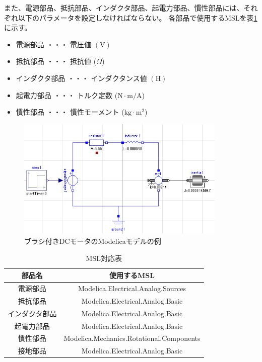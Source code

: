 また、電源部品、抵抗部品、インダクタ部品、起電力部品、慣性部品には、それぞれ以下のパラメータを設定しなければならない。
各部品で使用するMSLを表\ref{tab:MSL}に示す。
\begin{itemize}
	\item 電源部品 ・・・ 電圧値 $(\mathrm{V})$
	\item 抵抗部品 ・・・ 抵抗値 ($\Omega$)
	\item インダクタ部品 ・・・ インダクタンス値 $(\mathrm{H})$
	\item 起電力部品 ・・・ トルク定数 ($\mathrm{N\cdot m/A}$)
	\item 慣性部品 ・・・ 慣性モーメント ($\mathrm{kg\cdot m^2}$)
\end{itemize}

\begin{figure}[t]
	\centering
	\includegraphics[width=10cm]{./Image/tantai_model.png}
	\caption{ブラシ付きDCモータのModelicaモデルの例}
	\label{fig:tantai_model}
  \end{figure}
  

\begin{table}[t]
	\centering
	\caption{MSL対応表}
	\begin{tabular}{|c|c|} \hline
	  部品名 & 使用するMSL \\ \hline \hline
	  電源部品 & Modelica.Electrical.Analog.Sources \\ \hline
	  抵抗部品 & Modelica.Electrical.Analog.Basic \\ \hline
	  インダクタ部品 & Modelica.Electrical.Analog.Basic \\ \hline
	  起電力部品 & Modelica.Electrical.Analog.Basic \\ \hline
	  慣性部品 & Modelica.Mechanics.Rotational.Components \\ \hline
	  接地部品 & Modelica.Electrical.Analog.Basic \\ \hline
	\end{tabular}
	\label{tab:MSL}
  \end{table}


